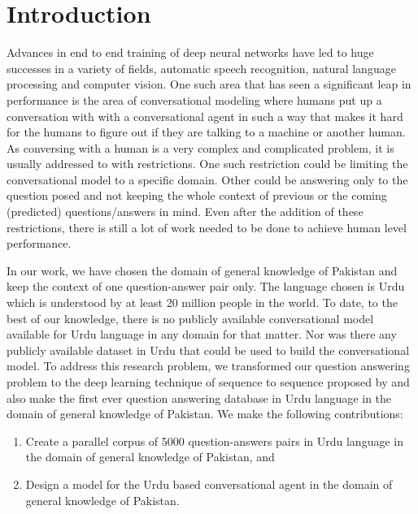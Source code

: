 \documentclass[conference]{IEEEtran}
\begin{document}
\section{Introduction}

Advances in end to end training of deep neural networks have led to huge successes in a variety of fields, automatic speech recognition, natural language processing and computer vision. One such area that has seen a significant leap in performance is the area of conversational modeling where humans put up a conversation with with a conversational agent in such a way that makes it hard for the humans to figure out if they are talking to a machine or another human. As conversing with a human is a very complex and complicated problem, it is usually addressed to with restrictions. One such restriction could be limiting the conversational model to a specific domain. Other could be answering only to the question posed and not keeping the whole context of previous or the coming (predicted) questions/answers in mind. Even after the addition of these restrictions, there is still a lot of work needed to be done to achieve human level performance.

In our work, we have chosen the domain of general knowledge of Pakistan and keep the context of one question-answer pair only. The language chosen is Urdu which is understood by at least 20 million people in the world. To date, to the best of our knowledge, there is no publicly available conversational model available for Urdu language in any domain for that matter. Nor was there any publicly available dataset in Urdu that could be used to build the conversational model. To address this research problem, we transformed our question answering problem to the deep learning technique of sequence to sequence proposed  by \cite{sutskever2014sequence} and also make the first ever question answering database in Urdu language in the domain of general knowledge of Pakistan. We make the following contributions:
 
\begin{enumerate}
\item Create a parallel corpus of 5000 question-answers pairs in Urdu language in the domain of general knowledge of Pakistan, and 
\item Design a model for the Urdu based conversational agent in the domain of general knowledge of Pakistan.
\end{enumerate}
\end{document}
